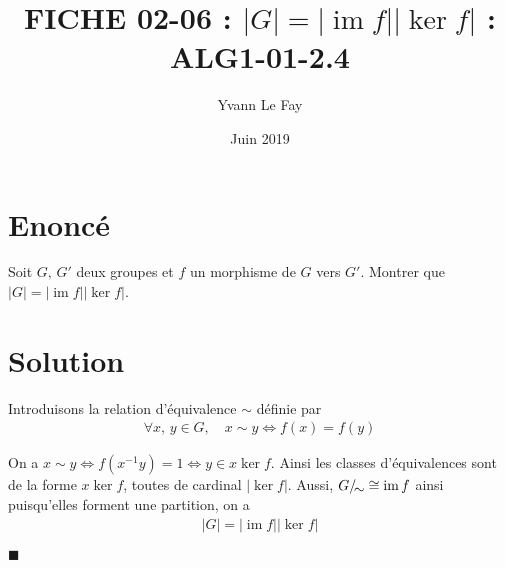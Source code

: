 \documentclass{article}
\newcommand*{\QED}{\hfill\ensuremath{\blacksquare}}%
\DeclareMathOperator{\im}{im}
\begin{document}
\title{FICHE 02-06 : $|G|=|\im f||\ker f|$ : ALG1-01-2.4}
\author{Yvann Le Fay}
\date{Juin 2019}
\maketitle
\section*{Enoncé}
Soit $G,\, G'$ deux groupes et $f$ un morphisme de $G$ vers $G'$. Montrer que $|G|=|\im f||\ker f|$.
\section*{Solution}
Introduisons la relation d'équivalence $\sim$ définie par 
\begin{align*}
\forall x,\, y\in G,\quad x\sim y \Longleftrightarrow f(x) = f(y)
\end{align*}

On a $x\sim y \Longleftrightarrow f(x^{-1}y) = 1 \Longleftrightarrow y\in x\ker f$. Ainsi les classes d'équivalences sont de la forme $x\ker f$, toutes de cardinal $|\ker f|$. Aussi, $G/\!\raisebox{-.50ex}{\ensuremath{\sim}} \cong \im f$ ainsi puisqu'elles forment une partition, on a
\begin{align*}
|G|=|\im f||\ker f|
\end{align*}


\QED
\end{document}
